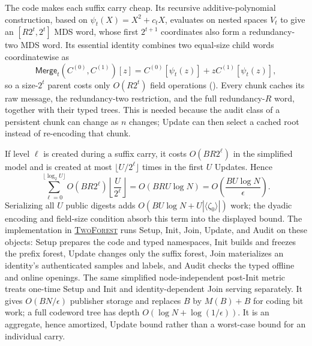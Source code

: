 \documentclass[11pt]{article}
\begin{document}
The code makes each suffix carry cheap.  Its recursive additive-polynomial
construction, based on $\psi_t(X)=X^2+c_tX$, evaluates on nested spaces $V_t$
to give an $[R2^t,2^t]$ MDS word, whose first $2^{t+1}$ coordinates also form a
redundancy-two MDS word.  Its essential identity combines two equal-size child
words coordinatewise as
\[
 \mathsf{Merge}_t(C^{(0)},C^{(1)})[z]
 =C^{(0)}[\psi_t(z)]+zC^{(1)}[\psi_t(z)],
\]
so a size-$2^t$ parent costs only $O(R2^t)$ field operations
().  Every chunk caches its raw message, the
redundancy-two restriction, and the full redundancy-$R$ word, together with
their typed trees.  This is needed because the audit class of a persistent
chunk can change as $n$ changes; Update can then select a cached root instead
of re-encoding that chunk.

If level $\ell$ is created during a suffix carry, it costs
$O(BR2^\ell)$ in the simplified model and is created at most
$\lfloor U/2^\ell\rfloor$ times in the first $U$ Updates.  Hence
\[
\sum_{\ell=0}^{\lfloor\log_2U\rfloor}O(BR2^\ell)
       \left\lfloor\frac{U}{2^\ell}\right\rfloor
 =O(BRU\log N)=O\!\left(\frac{BU\log N}{\epsilon}\right).
\]
Serializing all $U$ public digests adds
$O(BU\log N+U|\langle\zeta_0\rangle|)$ work; the dyadic encoding and field-size
condition absorb this term into the displayed bound.
The implementation in \hyperref[alg:twoforest]{\textsc{TwoForest}} runs
Setup, Init, Join, Update, and Audit on these objects: Setup prepares the code
and typed namespaces, Init builds and freezes the prefix forest, Update changes
only the suffix forest, Join materializes an identity's authenticated samples
and labels, and Audit checks the typed offline and online openings.  The same
simplified node-independent post-Init metric treats one-time Setup and Init and
identity-dependent Join serving separately.  It gives $O(BN/\epsilon)$
publisher storage and replaces $B$ by $M(B)+B$ for coding bit work; a full
codeword tree has depth $O(\log N+\log(1/\epsilon))$.  It is an aggregate,
hence amortized, Update bound rather than a worst-case bound for an individual
carry.
\end{document}
